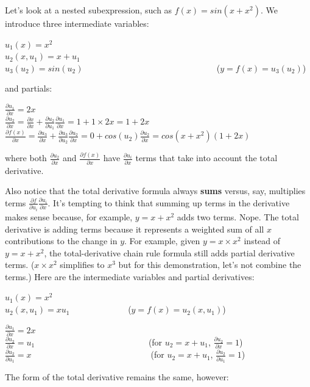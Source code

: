 \documentclass[11pt]{article}
\begin{document}
Let's look at a nested subexpression, such as $f(x) = sin(x + x^2)$.  We introduce three intermediate variables:

$u_1(x) = x^2$\\
$u_2(x,u_1) = x + u_1$\\
$u_3(u_2) = sin(u_2)$ ~~~~~~~~~~~~~~~~~~~~~~~~~~~~~~ ($y = f(x) = u_3(u_2)$)

and partials:

$\frac{\partial u_1}{\partial x} = 2x$\\
$\frac{\partial u_2}{\partial x} = \frac{\partial x}{\partial x} + \frac{\partial u_2}{\partial u_1}\frac{\partial u_1}{\partial x} = 1 + 1 \times 2x = 1+2x$\\
$\frac{\partial f(x)}{\partial x} = \frac{\partial u_3}{\partial x} + \frac{\partial u_3}{\partial u_2}\frac{\partial u_2}{\partial x} = 0 + cos(u_2)\frac{\partial u_2}{\partial x} = cos(x+x^2)(1+2x)$

where both $\frac{\partial u_2}{\partial x}$ and $\frac{\partial f(x)}{\partial x}$ have $\frac{\partial u_i}{\partial x}$ terms that take into account the total derivative.

Also notice that the total derivative formula always {\bf sums} versus, say, multiplies terms $\frac{\partial f}{\partial u_i}\frac{\partial  u_i}{\partial  x}$.  It's tempting to think that summing up terms in the derivative makes sense because, for example, $y = x+x^2$ adds two terms. Nope. The total derivative is adding terms because it represents a weighted sum of all $x$ contributions to the change in $y$. For example, given $y = x \times x^2$ instead of $y = x + x^2$, the total-derivative chain rule formula still adds partial derivative terms. ($x \times x^2$  simplifies to $x^3$ but for this demonstration, let's not combine the terms.) Here are the intermediate variables and partial derivatives:

$u_1(x) = x^2$\\
$u_2(x,u_1) = x u_1$ ~~~\,~~~~~~~~~ ($y = f(x) = u_2(x,u_1)$)

$\frac{\partial u_1}{\partial x} = 2x$\\
$\frac{\partial u_2}{\partial x} = u_1$ ~~~~~~~~~~~~~~~~~~~~~~~~~~(for $u_2 = x + u_1$, $\frac{\partial u_2}{\partial x} = 1$)\\
$\frac{\partial u_2}{\partial u_1} = x$ \,~~~~~~~~~~~~~~~~~~~~~~~~~~~(for $u_2 = x + u_1$, $\frac{\partial u_2}{\partial u_1} = 1$)

The form of the total derivative remains the same, however:
\end{document}
